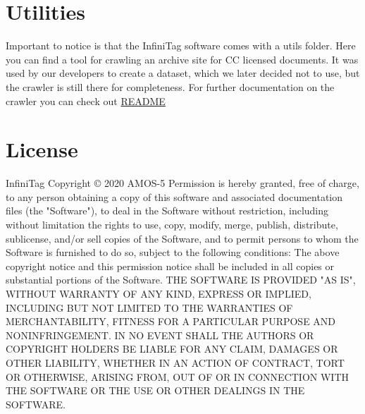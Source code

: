 \documentclass{article}
\begin{document}
\section{Utilities}
Important to notice is that the InfiniTag software comes with a utils folder.
Here you can find a tool for crawling an archive site for CC licensed documents. It was used by our developers to create a dataset, which we later decided not to use, but the crawler is still there for completeness.
For further documentation on the crawler you can check out \href{https://github.com/AMOS-5/infinitag/blob/master/docs/crawler/README.md}{README}


\section{License}
InfiniTag Copyright © 2020 AMOS-5
Permission is hereby granted,
free of charge, to any person obtaining a copy of this software and
associated documentation files (the "Software"), to deal in the Software
without restriction, including without limitation the rights to use, copy,
modify, merge, publish, distribute, sublicense, and/or sell copies of the
Software, and to permit persons to whom the Software is furnished to do so,
subject to the following conditions: The above copyright notice and this
permission notice shall be included in all copies or substantial portions
of the Software. THE SOFTWARE IS PROVIDED "AS IS", WITHOUT WARRANTY OF ANY
KIND, EXPRESS OR IMPLIED, INCLUDING BUT NOT LIMITED TO THE WARRANTIES OF
MERCHANTABILITY, FITNESS FOR A PARTICULAR PURPOSE AND NONINFRINGEMENT. IN
NO EVENT SHALL THE AUTHORS OR COPYRIGHT HOLDERS BE LIABLE FOR ANY CLAIM,
DAMAGES OR OTHER LIABILITY, WHETHER IN AN ACTION OF CONTRACT, TORT OR
OTHERWISE, ARISING FROM, OUT OF OR IN CONNECTION WITH THE SOFTWARE OR THE
USE OR OTHER DEALINGS IN THE SOFTWARE.
\end{document}
